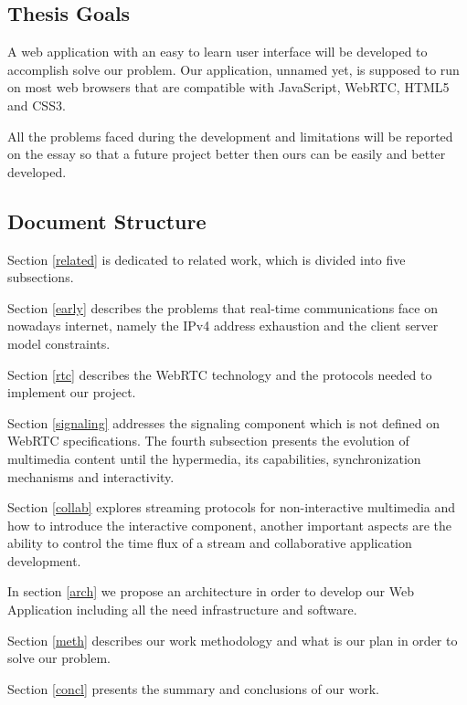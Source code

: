 \subsection{Thesis Goals} %

	A web application with an easy to learn user interface will be developed to accomplish solve our problem. Our application, unnamed yet, is supposed to run on most web browsers that are compatible with JavaScript, \ac{WebRTC}, \ac{HTML}5 and \ac{CSS}3.

	All the problems faced during the development and limitations will be reported on the essay so that a future project better then ours can be easily and better developed.

\subsection{Document Structure} %

	Section \ref{related} is dedicated to related work, which is divided into five subsections. 

	Section \ref{early} describes the problems that real-time communications face on nowadays internet, namely the \ac{IPv4} address exhaustion and the client server model constraints. 

	Section \ref{rtc} describes the \ac{WebRTC} technology and the protocols needed to implement our project. 

	Section \ref{signaling} addresses the signaling component which is not defined on \ac{WebRTC} specifications. The fourth subsection presents the evolution of multimedia content until the hypermedia, its capabilities, synchronization mechanisms and interactivity. 

	Section \ref{collab} explores streaming protocols for non-interactive multimedia and how to introduce the interactive component, another important aspects are the ability to control the time flux of a stream and collaborative application development.

	In section \ref{arch} we propose an architecture in order to develop our Web Application including all the need infrastructure and software.

	Section \ref{meth} describes our work methodology and what is our plan in order to solve our problem.

	Section \ref{concl} presents the summary and conclusions of our work.

